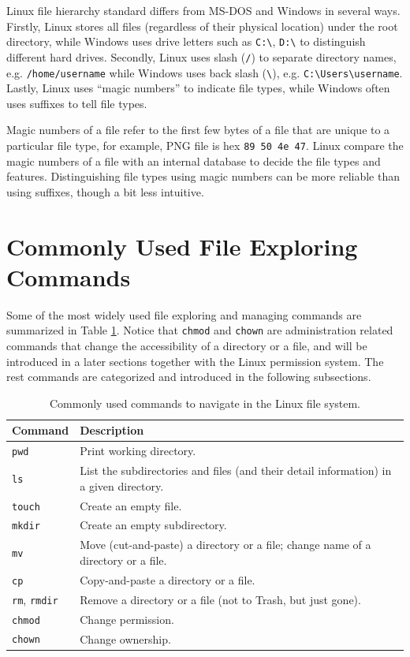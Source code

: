 Linux file hierarchy standard differs from MS-DOS and Windows in several ways. Firstly, Linux stores all files (regardless of their physical location) under the root directory, while Windows uses drive letters such as \verb|C:\|, \verb|D:\| to distinguish different hard drives. Secondly, Linux uses slash (\verb|/|) to separate directory names, e.g. \verb|/home/username| while Windows uses back slash (\verb|\|), e.g. \verb|C:\Users\username|. Lastly, Linux uses ``magic numbers'' to indicate file types, while Windows often uses suffixes to tell file types. 

Magic numbers of a file refer to the first few bytes of a file that are unique to a particular file type, for example, PNG file is hex \verb|89 50 4e 47|. Linux compare the magic numbers of a file with an internal database to decide the file types and features. Distinguishing file types using magic numbers can be more reliable than using suffixes, though a bit less intuitive.

\section{Commonly Used File Exploring Commands} \label{ch:fm:sec:filemanagement}

Some of the most widely used file exploring and managing commands are summarized in Table \ref{ch:fm:tab:commonfilecommands}. Notice that \verb|chmod| and \verb|chown| are administration related commands that change the accessibility of a directory or a file, and will be introduced in a later sections together with the Linux permission system. The rest commands are categorized and introduced in the following subsections.

\begin{table}[!htb]
  \centering \caption{Commonly used commands to navigate in the Linux file system.}\label{ch:fm:tab:commonfilecommands}
  \begin{tabularx}{\textwidth}{lX}
    \hline
    Command & Description \\ \hline
    \verb|pwd| & Print working directory. \\ 
    \verb|ls| & List the subdirectories and files (and their detail information) in a given directory. \\ 
    \verb|touch| & Create an empty file. \\ 
    \verb|mkdir| & Create an empty subdirectory. \\ 
    \verb|mv| & Move (cut-and-paste) a directory or a file; change name of a directory or a file. \\ 
    \verb|cp| & Copy-and-paste a directory or a file. \\ 
    \verb|rm|, \verb|rmdir| & Remove a directory or a file (not to Trash, but just gone). \\ 
    \verb|chmod| & Change permission. \\ 
    \verb|chown| & Change ownership. \\
    \hline
  \end{tabularx}
\end{table}

